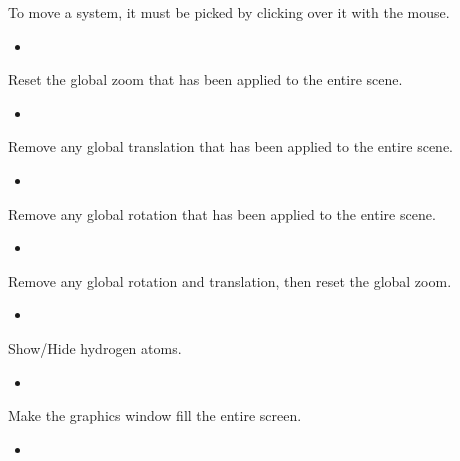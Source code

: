 \documentclass[letterpaper,11pt,english]{sphinxmanual}
\begin{document}
\sphinxAtStartPar
To move a system, it must be picked by clicking over it with the mouse.
\begin{itemize}
\item {} 
\sphinxAtStartPar
{}

\end{itemize}

\sphinxAtStartPar
Reset the global zoom that has been applied to the entire scene.
\begin{itemize}
\item {} 
\sphinxAtStartPar
{}

\end{itemize}

\sphinxAtStartPar
Remove any global translation that has been applied to the entire scene.
\begin{itemize}
\item {} 
\sphinxAtStartPar
{}

\end{itemize}

\sphinxAtStartPar
Remove any global rotation that has been applied to the entire scene.
\begin{itemize}
\item {} 
\sphinxAtStartPar
{}

\end{itemize}

\sphinxAtStartPar
Remove any global rotation and translation, then reset the global zoom.
\begin{itemize}
\item {} 
\sphinxAtStartPar
{}

\end{itemize}

\sphinxAtStartPar
Show/Hide hydrogen atoms.
\begin{itemize}
\item {} 
\sphinxAtStartPar
{}

\end{itemize}

\sphinxAtStartPar
Make the graphics window fill the entire screen.
\begin{itemize}
\item {} 
\sphinxAtStartPar
{}

\end{itemize}
\end{document}
